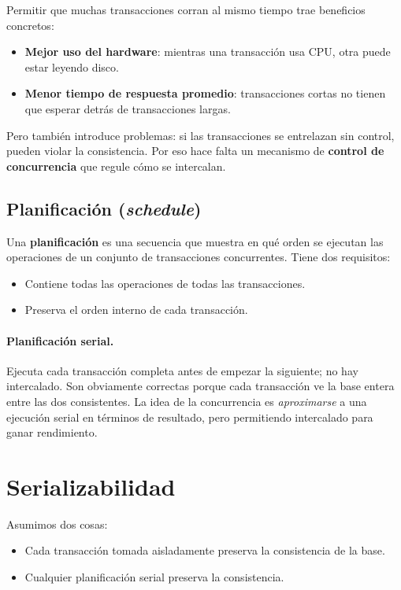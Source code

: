 \documentclass[11pt,a4paper]{article}
\begin{document}
Permitir que muchas transacciones corran al mismo tiempo trae beneficios
concretos:

\begin{itemize}
    \item \textbf{Mejor uso del hardware}: mientras una transacción usa
    CPU, otra puede estar leyendo disco.
    \item \textbf{Menor tiempo de respuesta promedio}: transacciones
    cortas no tienen que esperar detrás de transacciones largas.
\end{itemize}

Pero también introduce problemas: si las transacciones se entrelazan
sin control, pueden violar la consistencia. Por eso hace falta un
mecanismo de \textbf{control de concurrencia} que regule cómo se
intercalan.

\subsection{Planificación (\emph{schedule})}

Una \textbf{planificación} es una secuencia que muestra en qué orden se
ejecutan las operaciones de un conjunto de transacciones concurrentes.
Tiene dos requisitos:

\begin{itemize}
    \item Contiene todas las operaciones de todas las transacciones.
    \item Preserva el orden interno de cada transacción.
\end{itemize}

\paragraph{Planificación serial.} Ejecuta cada transacción completa antes
de empezar la siguiente; no hay intercalado. Son obviamente correctas
porque cada transacción ve la base entera entre las dos consistentes.
La idea de la concurrencia es \emph{aproximarse} a una ejecución serial
en términos de resultado, pero permitiendo intercalado para ganar
rendimiento.

\section{Serializabilidad}

Asumimos dos cosas:
\begin{itemize}
    \item Cada transacción tomada aisladamente preserva la consistencia
    de la base.
    \item Cualquier planificación serial preserva la consistencia.
\end{itemize}
\end{document}
